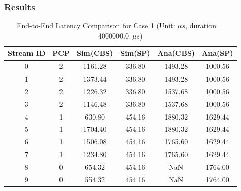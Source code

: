 \subsubsection{Results}
\begin{table}[H]
    \centering
    \caption{End-to-End Latency Comparison for Case 1 (Unit: $\mu s$, duration = 4000000.0~$\mu s$)}
    \label{tab:case1}
    \begin{tabular}{cccccc}
        \toprule
        \textbf{Stream ID} & \textbf{PCP} & \textbf{Sim(CBS)} & \textbf{Sim(SP)} & \textbf{Ana(CBS)} & \textbf{Ana(SP)} \\
        \midrule
        0 & 2 & 1161.28 & 336.80 & 1493.28 & 1000.56 \\
        1 & 2 & 1373.44 & 336.80 & 1493.28 & 1000.56 \\
        2 & 2 & 1226.32 & 336.80 & 1537.68 & 1000.56 \\
        3 & 2 & 1146.48 & 336.80 & 1537.68 & 1000.56 \\
        \midrule
        4 & 1 & 630.80 & 454.16 & 1880.32 & 1629.44 \\
        5 & 1 & 1704.40 & 454.16 & 1880.32 & 1629.44 \\
        6 & 1 & 1506.08 & 454.16 & 1765.60 & 1629.44 \\
        7 & 1 & 1234.80 & 454.16 & 1765.60 & 1629.44 \\
        \midrule
        8 & 0 & 654.32 & 454.16 & NaN & 1764.00 \\
        9 & 0 & 554.32 & 454.16 & NaN & 1764.00 \\
        \bottomrule
    \end{tabular}
\end{table}

